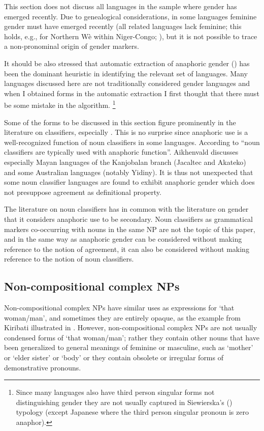 \documentclass[output=collectionpaper]{langsci/langscibook}
\begin{document}
This section does not discuss all languages in the sample where gender has emerged recently. Due to genealogical considerations, in some languages feminine gender must have emerged recently (all related languages lack feminine; this holds, e.g., for Northern Wè within Niger-Congo; \citealt{Paradis1983}), but it is not possible to trace a non-pronominal origin of gender markers.

It should be also stressed that automatic extraction of anaphoric gender () has been the dominant heuristic in identifying the relevant set of languages. Many languages discussed here are not traditionally considered gender languages and when I obtained forms in the automatic extraction I first thought that there must be some mistake in the algorithm.%
\footnote{%
Since many languages also have third person singular forms not distinguishing gender they are not usually captured in Siewierska’s (\citealt*{Siewierska2005}) typology (except Japanese where the third person singular pronoun is zero anaphor).
}%

Some of the forms to be discussed in this section figure prominently in the literature on classifiers, especially . This is no surprise since anaphoric use is a well-recognized function of noun classifiers in some languages. According to \citet[87]{Aikhenvald2000} “noun classifiers are typically used with anaphoric function”. Aikhenvald discusses especially Mayan languages of the Kanjobalan branch (Jacaltec and Akateko) and some Australian languages (notably Yidiny). It is thus not unexpected that some noun classifier languages are found to exhibit anaphoric gender which does not presuppose agreement as definitional property.

The literature on noun classifiers has in common with the literature on gender that it considers anaphoric use to be secondary. Noun classifiers as grammatical markers co-occurring with nouns in the same NP are not the topic of this paper, and in the same way as anaphoric gender can be considered without making reference to the notion of agreement, it can also be considered without making reference to the notion of noun classifiers.


\subsection{Non-compositional complex NPs}
\label{sec:BW:5.2}

Non-compositional complex NPs have similar uses as expressions for ‘that woman/man’, and sometimes they are entirely opaque, as the example from Kiribati illustrated in . However, non-compositional complex NPs are not usually condensed forms of ‘that woman/man’; rather they contain other nouns that have been generalized to general meanings of feminine or masculine, such as ‘mother’ or ‘elder sister’ or ‘body’ or they contain obsolete or irregular forms of demonstrative pronouns.
\end{document}
